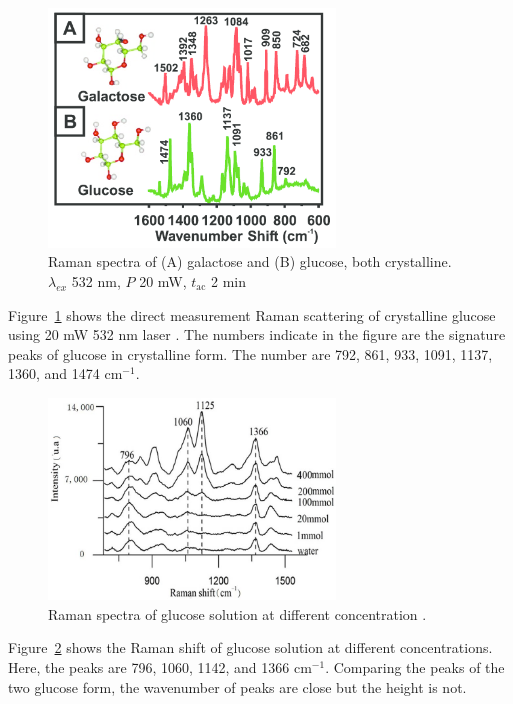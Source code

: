 \begin{figure}
    \caption{Raman spectra of (A) galactose and (B) glucose, both crystalline. 
    $\lambda_{ex}$ 532 nm, $P$ 20 mW, $t_{\text{ac}}$ 2 min \citep{crystallineGlucose}}
    \centerline{\includegraphics[width=3in]{figures/crytallineGlucose-RS.png}}
    \label{fig:crytallineGlucose-RS}
\end{figure}

Figure~\ref{fig:crytallineGlucose-RS} shows the direct measurement Raman scattering of crystalline glucose using 20 mW 532 nm laser \citep{crystallineGlucose}.
The numbers indicate in the figure are the signature peaks of glucose in crystalline form. The number are 792, 861, 933, 1091, 1137, 1360, and 1474 $\text{cm}^{-1}$.

\begin{figure}
    \caption{Raman spectra of glucose solution at different concentration \citep{solutionGlucose}.}
    \centerline{\includegraphics[width=3in]{figures/solutionGlucose-RS.jpg}}
    \label{fig:solutionGlucose-RS}
\end{figure}

Figure~\ref{fig:solutionGlucose-RS} shows the Raman shift of glucose solution at different concentrations.
Here, the peaks are 796, 1060, 1142, and 1366 $\text{cm}^{-1}$.
Comparing the peaks of the two glucose form, the wavenumber of peaks are close but the height is not.

